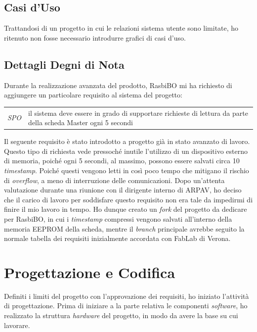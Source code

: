 \subsection{Casi d'Uso}

Trattandosi di un progetto in cui le relazioni sistema utente sono limitate, ho ritenuto non fosse necessario introdurre grafici di casi d'uso.  

\subsection{Dettagli Degni di Nota}

Durante la realizzazione avanzata del prodotto, RasbiBO mi ha richiesto di aggiungere un particolare requisito al sistema del progetto:

\begin{longtable}{ p{} | p{ }}
\textit{SPO} & il sistema deve essere in grado di supportare richieste di lettura da parte della scheda Master ogni 5 secondi
\end{longtable}

Il seguente requisito è stato introdotto a progetto già in stato avanzato di lavoro. Questo tipo di richiesta vede pressoché inutile l'utilizzo di un dispositivo esterno di memoria, poiché ogni 5 secondi, al massimo, possono essere salvati circa 10 \textit{timestamp}. Poiché questi vengono letti in così poco tempo che mitigano il rischio di \textit{overflow}, a meno di interruzione delle comunicazioni. Dopo un'attenta valutazione durante una riunione con il dirigente interno di ARPAV, ho deciso che il carico di lavoro per soddisfare questo requisito non era tale da impedirmi di finire il mio lavoro in tempo. Ho dunque creato un \textit{fork} del progetto da dedicare per RasbiBO, in cui i \textit{timestamp} compressi vengono salvati all'interno della memoria EEPROM della scheda, mentre il \textit{branch} principale avrebbe seguito la normale tabella dei requisiti inizialmente accordata con FabLab di Verona.


\section{Progettazione e Codifica}

Definiti i limiti del progetto con l'approvazione dei requisiti, ho iniziato l'attività di progettazione. Prima di iniziare a la parte relativa le componenti \textit{software}, ho realizzato la struttura \textit{hardware} del progetto, in modo da avere la base su cui lavorare.



